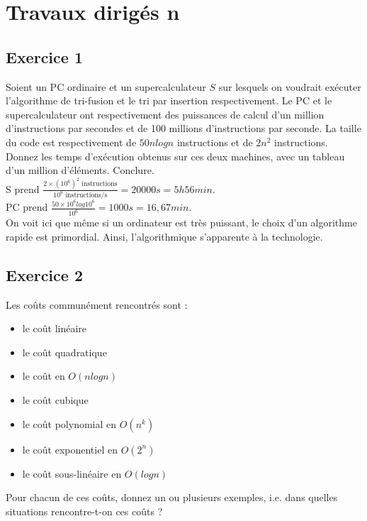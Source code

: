 \chapter{Travaux dirigés n}
\section{Exercice 1}
Soient un PC ordinaire et un supercalculateur $S$ sur lesquels on voudrait
exécuter l'algorithme de tri-fusion et le tri par insertion respectivement.
Le PC et le supercalculateur ont respectivement des puissances de calcul
d'un million d'instructions par secondes et de 100 millions d'instructions
par seconde. La taille du code est respectivement de $50n log n$
instructions et de $2n^2$ instructions.\\

Donnez les temps d'exécution obtenus sur ces deux machines, avec un tableau
d'un million d'éléments. Conclure.\\

S prend $\frac{2 \times (10^6)^2\text{ instructions}}{10^8
\text{ instructions/s}} = 20000 s = 5h56min$.\\

PC prend $\frac{50 \times 10^6log10^6}{10^6} = 1000 s = 16,67min$.\\

On voit ici que même si un ordinateur est très puissant, le choix d'un
algorithme rapide est primordial. Ainsi, l'algorithmique s'apparente à la
technologie.

\section{Exercice 2}
Les coûts communément rencontrés sont :

\begin{itemize}
\item le coût linéaire
\item le coût quadratique
\item le coût en $O(n logn)$
\item le coût cubique
\item le coût polynomial en $O(n^k)$
\item le coût exponentiel en $O(2^n)$
\item le coût sous-linéaire en $O(logn)$
\end{itemize}

Pour chacun de ces coûts, donnez un ou plusieurs exemples, i.e. dans quelles
situations rencontre-t-on ces coûts ?

